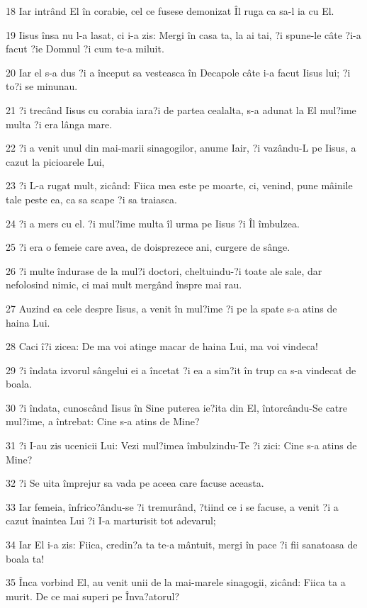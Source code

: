 \par 18 Iar intrând El în corabie, cel ce fusese demonizat Îl ruga ca sa-l ia cu El.
\par 19 Iisus însa nu l-a lasat, ci i-a zis: Mergi în casa ta, la ai tai, ?i spune-le câte ?i-a facut ?ie Domnul ?i cum te-a miluit.
\par 20 Iar el s-a dus ?i a început sa vesteasca în Decapole câte i-a facut Iisus lui; ?i to?i se minunau.
\par 21 ?i trecând Iisus cu corabia iara?i de partea cealalta, s-a adunat la El mul?ime multa ?i era lânga mare.
\par 22 ?i a venit unul din mai-marii sinagogilor, anume Iair, ?i vazându-L pe Iisus, a cazut la picioarele Lui,
\par 23 ?i L-a rugat mult, zicând: Fiica mea este pe moarte, ci, venind, pune mâinile tale peste ea, ca sa scape ?i sa traiasca.
\par 24 ?i a mers cu el. ?i mul?ime multa îl urma pe Iisus ?i Îl îmbulzea.
\par 25 ?i era o femeie care avea, de doisprezece ani, curgere de sânge.
\par 26 ?i multe îndurase de la mul?i doctori, cheltuindu-?i toate ale sale, dar nefolosind nimic, ci mai mult mergând înspre mai rau.
\par 27 Auzind ea cele despre Iisus, a venit în mul?ime ?i pe la spate s-a atins de haina Lui.
\par 28 Caci î?i zicea: De ma voi atinge macar de haina Lui, ma voi vindeca!
\par 29 ?i îndata izvorul sângelui ei a încetat ?i ea a sim?it în trup ca s-a vindecat de boala.
\par 30 ?i îndata, cunoscând Iisus în Sine puterea ie?ita din El, întorcându-Se catre mul?ime, a întrebat: Cine s-a atins de Mine?
\par 31 ?i I-au zis ucenicii Lui: Vezi mul?imea îmbulzindu-Te ?i zici: Cine s-a atins de Mine?
\par 32 ?i Se uita împrejur sa vada pe aceea care facuse aceasta.
\par 33 Iar femeia, înfrico?ându-se ?i tremurând, ?tiind ce i se facuse, a venit ?i a cazut înaintea Lui ?i I-a marturisit tot adevarul;
\par 34 Iar El i-a zis: Fiica, credin?a ta te-a mântuit, mergi în pace ?i fii sanatoasa de boala ta!
\par 35 Înca vorbind El, au venit unii de la mai-marele sinagogii, zicând: Fiica ta a murit. De ce mai superi pe Înva?atorul?
